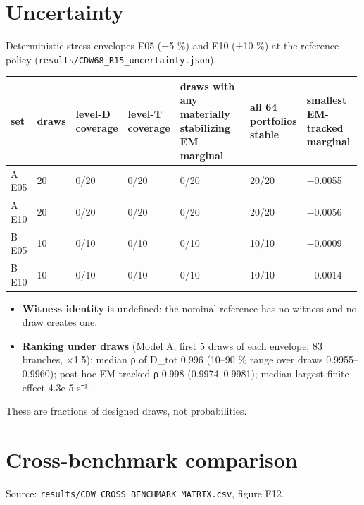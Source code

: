 \documentclass[10pt,a4paper]{article}
\begin{document}
\section{Uncertainty}
Deterministic stress envelopes E05 (±5 \%) and E10 (±10 \%) at the reference policy (\texttt{results/\allowbreak{}CDW68\_\allowbreak{}R15\_\allowbreak{}uncertainty.json}).

{\small
\begin{longtable}{L{0.060\linewidth}L{0.060\linewidth}L{0.105\linewidth}L{0.105\linewidth}L{0.322\linewidth}L{0.158\linewidth}L{0.184\linewidth}}
\toprule
\textbf{set} & \textbf{draws} & \textbf{level-D coverage} & \textbf{level-T coverage} & \textbf{draws with any materially stabilizing EM marginal} & \textbf{all 64 portfolios stable} & \textbf{smallest EM-tracked marginal} \\
\midrule
\endhead
A E05 & 20 & 0/20 & 0/20 & 0/20 & 20/20 & −0.0055 \\
A E10 & 20 & 0/20 & 0/20 & 0/20 & 20/20 & −0.0056 \\
B E05 & 10 & 0/10 & 0/10 & 0/10 & 10/10 & −0.0009 \\
B E10 & 10 & 0/10 & 0/10 & 0/10 & 10/10 & −0.0014 \\
\bottomrule
\end{longtable}}
\begin{itemize}
\item \textbf{Witness identity} is undefined: the nominal reference has no witness and no draw creates one.
\item \textbf{Ranking under draws} (Model A; first 5 draws of each envelope, 83 branches, ×1.5): median ρ of D\_tot 0.996 (10–90 \% range over draws 0.9955–0.9960); post-hoc EM-tracked ρ 0.998 (0.9974–0.9981); median largest finite effect 4.3e-5 s⁻¹.
\end{itemize}
These are fractions of designed draws, not probabilities.

\section{Cross-benchmark comparison}
Source: \texttt{results/\allowbreak{}CDW\_\allowbreak{}CROSS\_\allowbreak{}BENCHMARK\_\allowbreak{}MATRIX.csv}, figure F12.
\end{document}
